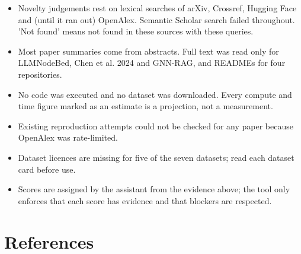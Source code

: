 \documentclass[11pt,a4paper]{article}
\begin{document}
\begin{itemize}
\item Novelty judgements rest on lexical searches of arXiv, Crossref, Hugging Face and (until it ran out) OpenAlex. Semantic Scholar search failed throughout. 'Not found' means not found in these sources with these queries.
\item Most paper summaries come from abstracts. Full text was read only for LLMNodeBed, Chen et al. 2024 and GNN-RAG, and READMEs for four repositories.
\item No code was executed and no dataset was downloaded. Every compute and time figure marked as an estimate is a projection, not a measurement.
\item Existing reproduction attempts could not be checked for any paper because OpenAlex was rate-limited.
\item Dataset licences are missing for five of the seven datasets; read each dataset card before use.
\item Scores are assigned by the assistant from the evidence above; the tool only enforces that each score has evidence and that blockers are respected.
\end{itemize}

\section{References}



\end{document}
